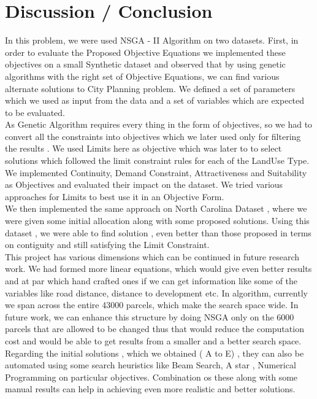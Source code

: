 \documentclass{sig-alternate}
\begin{document}
 \section{Discussion / Conclusion}
 In this problem, we were  used NSGA - II Algorithm on two datasets. First, in order to evaluate the Proposed Objective Equations we implemented these objectives on a small Synthetic dataset  and observed that by using genetic algorithms with the right set of Objective Equations, we can find various alternate solutions to City Planning problem. We defined a set of parameters which we used as input from the data and a set of variables which are expected to be evaluated. \\
 As Genetic Algorithm requires every thing in the form of objectives, so we had to convert all the constraints into objectives which we  later used only for filtering the results .  We used Limits here as objective which was later to to select solutions which followed the limit constraint rules for each of the LandUse Type. 
We implemented Continuity, Demand Constraint, Attractiveness and Suitability as Objectives and evaluated their impact on the dataset. We tried various approaches for Limits to best use it in an Objective Form. \\
We then implemented the same approach on North Carolina Dataset , where we were given some initial allocation along with some proposed solutions. Using this dataset , we were able to find solution , even better than those proposed in terms on contiguity and still satisfying  the Limit Constraint.\\

This project has various dimensions which can be continued in future research work. We had formed more linear equations, which would give even better results and at par which hand crafted ones if we can get information like some of the variables like road distance, distance to development etc. 
In algorithm, currently we span across the entire 43000 parcels, which make the search space wide. In future work, we can enhance this structure by doing NSGA only on the 6000 parcels that are allowed to be changed thus that would reduce the computation cost and would be able to get results from a smaller and a better search space. \\

Regarding the initial solutions , which we obtained  ( A to E) , they can also be automated using some search heuristics like Beam Search, A star , Numerical Programming on particular objectives. Combination os these along with some manual results can help in achieving even more realistic and better solutions.\\ 
\end{document}
